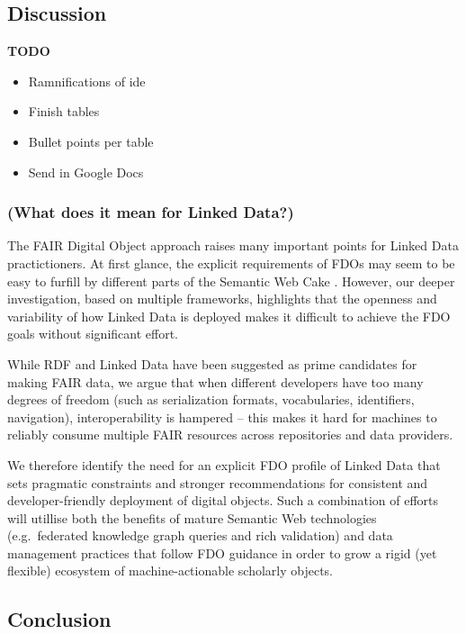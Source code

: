\hypertarget{ch3:discussion}{%
\subsection{Discussion}\label{ch3:discussion}}

\textbf{TODO}

\begin{itemize}
\tightlist
\item
  Ramnifications of ide
\item
  Finish tables
\item
  Bullet points per table
\item
  Send in Google Docs
\end{itemize}

\hypertarget{what-does-it-mean-for-linked-data}{%
\subsubsection{(What does it mean for Linked Data?)}\label{what-does-it-mean-for-linked-data}}

The FAIR Digital Object approach raises many important points for Linked Data practictioners.
At first glance, the explicit requirements of FDOs may seem to be easy to furfill by different parts of the Semantic Web Cake \cite{SemanticWebXML2000}.
However, our deeper investigation, based on multiple frameworks, highlights that the openness and variability of how Linked Data is deployed makes it difficult to achieve the FDO goals without significant effort.

While RDF and Linked Data have been suggested as prime candidates for making FAIR data, we argue that when different developers have too many degrees of freedom (such as serialization formats, vocabularies, identifiers, navigation), interoperability is hampered -- this makes it hard for machines to reliably consume multiple FAIR resources across repositories and data providers.

We therefore identify the need for an explicit FDO profile of Linked Data that sets pragmatic constraints and stronger recommendations for consistent and developer-friendly deployment of digital objects.
Such a combination of efforts will utillise both the benefits of mature Semantic Web technologies (e.g.~federated knowledge graph queries and rich validation) and data management practices that follow FDO guidance in order to grow a rigid (yet flexible) ecosystem of machine-actionable scholarly objects.

\hypertarget{conclusion}{%
\subsection{Conclusion}\label{conclusion}}

